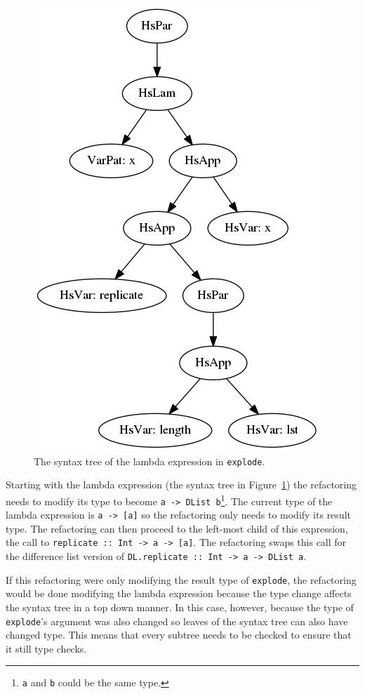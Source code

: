 \begin{figure}[h]
	\begin{center}
		\includegraphics[scale=.5]{graphVis/Chapter3/explodeLam.png}
	\end{center}
	\caption{The syntax tree of the lambda expression in \texttt{explode}.}\label{explodeLam}
\end{figure}

Starting with the lambda expression (the syntax tree in Figure~\ref{explodeLam}) the refactoring needs to modify its type to become \texttt{a -> DList b}\footnote{\texttt{a} and \texttt{b} could be the same type.}. The current type of the lambda expression is \texttt{a -> [a]} so the refactoring only needs to modify its result type. The refactoring can then proceed to the left-most child of this expression, the call to \texttt{replicate :: Int -> a -> [a]}. The refactoring swaps this call for the difference list version of \texttt{DL.replicate :: Int -> a -> DList a}. 

If this refactoring were only modifying the result type of \texttt{explode}, the refactoring would be done modifying the lambda expression because the type change affects the syntax tree in a top down manner. In this case, however, because  the type of \texttt{explode}'s argument was also changed so leaves of the syntax tree can also have changed type. This means that every subtree needs to be checked to ensure that it still type checks.

